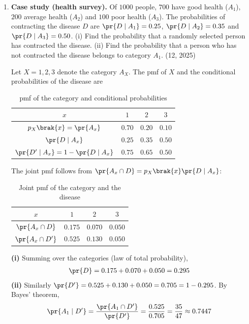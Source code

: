 \begin{enumerate}[label=\thesubsection.\arabic*, ref=\thesubsection.\theenumi]
\item
\textbf{Case study (health survey).} Of $1000$ people, $700$ have good health ($A_1$), $200$ average health ($A_2$) and $100$ poor health ($A_3$). The probabilities of contracting the disease $D$ are $\pr{D\mid A_1} = 0.25$, $\pr{D\mid A_2} = 0.35$ and $\pr{D\mid A_3} = 0.50$. (i) Find the probability that a randomly selected person has contracted the disease. (ii) Find the probability that a person who has not contracted the disease belongs to category $A_1$.
\hfill (12, 2025)

\solution
Let $X = 1, 2, 3$ denote the category $A_X$. The pmf of $X$ and the conditional probabilities of the disease are
\begin{table}[H]
	\centering
	\begin{tabular}{|c|c|c|c|}
		\hline
		$x$ & $1$ & $2$ & $3$ \\ \hline
		$p_X\brak{x} = \pr{A_x}$ & $0.70$ & $0.20$ & $0.10$ \\ \hline
		$\pr{D\mid A_x}$ & $0.25$ & $0.35$ & $0.50$ \\ \hline
		$\pr{D^{\prime}\mid A_x} = 1 - \pr{D\mid A_x}$ & $0.75$ & $0.65$ & $0.50$ \\ \hline
	\end{tabular}
	\caption{pmf of the category and conditional probabilities}
	\label{tab:CBSE12-q38}
\end{table}
The joint pmf follows from $\pr{A_x\cap D} = p_X\brak{x}\pr{D\mid A_x}$:
\begin{table}[H]
	\centering
	\begin{tabular}{|c|c|c|c|}
		\hline
		$x$ & $1$ & $2$ & $3$ \\ \hline
		$\pr{A_x\cap D}$ & $0.175$ & $0.070$ & $0.050$ \\ \hline
		$\pr{A_x\cap D^{\prime}}$ & $0.525$ & $0.130$ & $0.050$ \\ \hline
	\end{tabular}
	\caption{Joint pmf of the category and the disease}
	\label{tab:CBSE12-q38-joint}
\end{table}
\textbf{(i)} Summing over the categories (law of total probability),
\begin{align}
	\pr{D} = 0.175 + 0.070 + 0.050 = 0.295
\end{align}
\textbf{(ii)} Similarly $\pr{D^{\prime}} = 0.525 + 0.130 + 0.050 = 0.705 = 1 - 0.295$. By Bayes' theorem,
\begin{align}
	\pr{A_1\mid D^{\prime}} = \frac{\pr{A_1\cap D^{\prime}}}{\pr{D^{\prime}}} = \frac{0.525}{0.705} = \frac{35}{47} \approx 0.7447

\end{align}
\end{enumerate}
